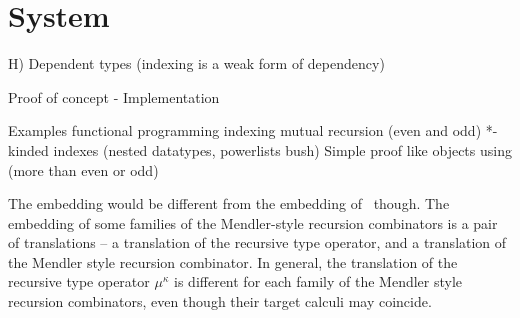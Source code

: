 \section{System \Fi}\label{sec:Fi}


H) Dependent types (indexing is a weak form of dependency)

Proof of concept - Implementation

Examples
    functional programming
    indexing
    mutual recursion (even and odd)
    *-kinded indexes (nested datatypes, powerlists bush)
    Simple proof like objects using (more than even or odd)

The embedding would be different from
the embedding of \MPr\ though. The embedding of some families of
the Mendler-style recursion combinators is a pair of translations --
a translation of the recursive type operator, and a translation of
the Mendler style recursion combinator. In general, the translation of
the recursive type operator $\mu^\kappa$ is different for each family
of the Mendler style recursion combinators, even though their target
calculi may coincide.

